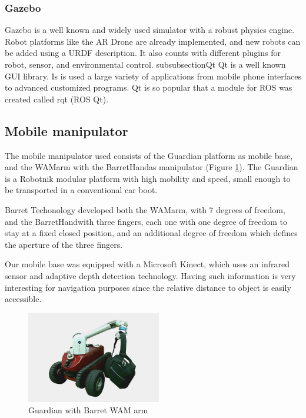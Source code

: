 \documentclass[11pt,a4paper]{article}
\begin{document}
\subsubsection{Gazebo}
Gazebo is a well known and widely used simulator with a robust physics engine. 
Robot platforms like the AR Drone are already implemented, and new robots can be added using a URDF description. It also counts with different plugins  for robot, sensor, and environmental control. 
subsubsection{Qt}
Qt is a well known GUI library. Is is used a large variety of applications from mobile phone interfaces to advanced customized programs. Qt is so popular that a module for ROS was
created called rqt (ROS Qt).


\subsection{Mobile manipulator}


The mobile manipulator used consists of the Guardian platform as mobile base, and the WAM\texttrademark  arm with the BarretHand\texttrademark  as manipulator (Figure \ref{fig:gwam}). The Guardian is a Robotnik modular platform with high mobility and speed, small enough to be transported in a conventional car boot. 

Barret Techonology developed both the WAM\texttrademark arm, with 7 degrees of freedom, and the BarretHand\texttrademark  with three fingers, each one with one degree of freedom to stay at a fixed closed position, and an additional degree of freedom which defines the aperture of the three fingers.

Our mobile base was equipped with a Microsoft Kinect, which uses an infrared sensor and adaptive depth detection technology. Having such information is very interesting for 
navigation
purposes since the relative distance to object is easily accessible.

\begin{figure}[ht]	
\centering
\includegraphics[height=4cm]{gwam1.jpg}
\caption{Guardian with Barret WAM arm}
\label{fig:gwam}
\end{figure}
\end{document}
